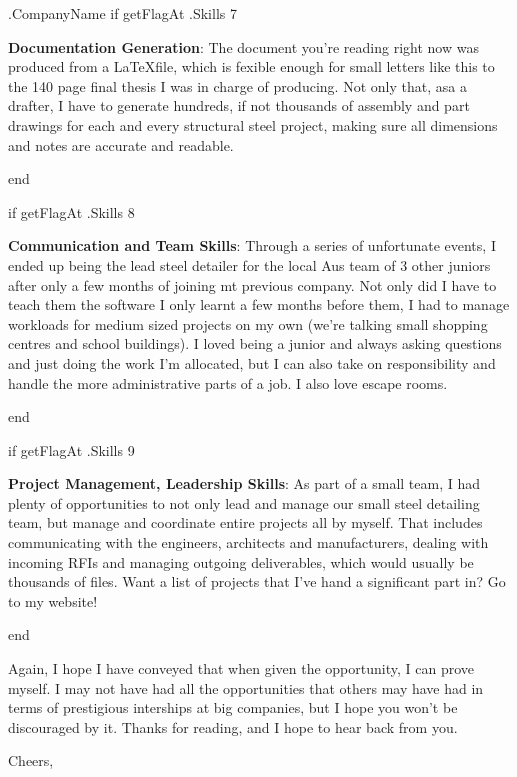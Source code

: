 \documentclass[10pt]{letter}
\begin{document}
\begin{letter}{
    {{ .CompanyName }}
}
{{ if getFlagAt .Skills 7 }}
\begin{minipage}{\linewidth}
\textbf{Documentation Generation}: The document you're reading right now was produced from a \LaTeX file, which is fexible enough for small letters like this to the 140 page final thesis I was in charge of producing. Not only that, asa a drafter, I have to generate hundreds, if not thousands of assembly and part drawings for each and every structural steel project, making sure all dimensions and notes are accurate and readable. 
\end{minipage}
{{ end }}

{{ if getFlagAt .Skills 8 }}
\begin{minipage}{\linewidth}
\textbf{Communication and Team Skills}: Through a series of unfortunate events, I ended up being the lead steel detailer for the local Aus team of 3 other juniors after only a few months of joining mt previous company. Not only did I have to teach them the software I only learnt a few months before them, I had to manage workloads for medium sized projects on my own (we're talking small shopping centres and school buildings). I loved being a junior and always asking questions and just doing the work I'm allocated, but I can also take on responsibility and handle the more administrative parts of a job. I also love escape rooms. 
\end{minipage}
{{ end }}

{{ if getFlagAt .Skills 9 }}
\begin{minipage}{\linewidth}
\textbf{Project Management, Leadership Skills}: As part of a small team, I had plenty of opportunities to not only lead and manage our small steel detailing team, but manage and coordinate entire projects all by myself. That includes communicating with the engineers, architects and manufacturers, dealing with incoming RFIs and managing outgoing deliverables, which would usually be thousands of files. Want a list of projects that I've hand a significant part in? Go to my website!
\end{minipage}
{{ end }}


\begin{minipage}{\linewidth}
Again, I hope I have conveyed that when given the opportunity, I can prove myself. I may not have had all the opportunities that others may have had in terms of prestigious interships at big companies, but I hope you won't be discouraged by it. Thanks for reading, and I hope to hear back from you. 
\end{minipage}


\closing{Cheers,}

\end{letter}
\end{document}
